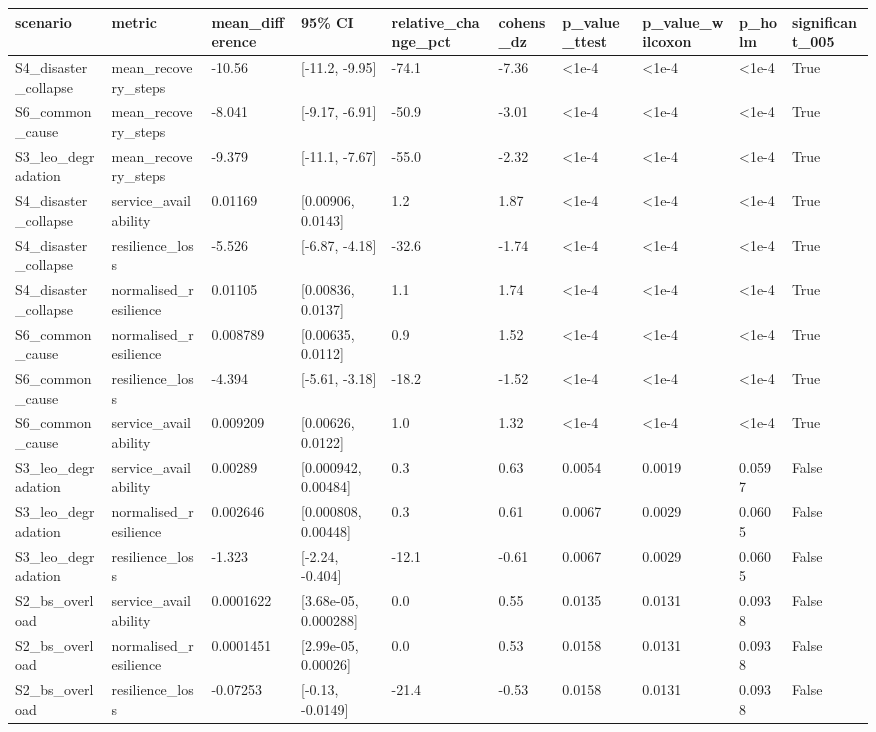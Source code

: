 \begin{tabular}{llllllllll}
\toprule
scenario & metric & mean\_difference & 95\% CI & relative\_change\_pct & cohens\_dz & p\_value\_ttest & p\_value\_wilcoxon & p\_holm & significant\_005 \\
\midrule
S4\_disaster\_collapse & mean\_recovery\_steps & -10.56 & [-11.2, -9.95] & -74.1 & -7.36 & <1e-4 & <1e-4 & <1e-4 & True \\
S6\_common\_cause & mean\_recovery\_steps & -8.041 & [-9.17, -6.91] & -50.9 & -3.01 & <1e-4 & <1e-4 & <1e-4 & True \\
S3\_leo\_degradation & mean\_recovery\_steps & -9.379 & [-11.1, -7.67] & -55.0 & -2.32 & <1e-4 & <1e-4 & <1e-4 & True \\
S4\_disaster\_collapse & service\_availability & 0.01169 & [0.00906, 0.0143] & 1.2 & 1.87 & <1e-4 & <1e-4 & <1e-4 & True \\
S4\_disaster\_collapse & resilience\_loss & -5.526 & [-6.87, -4.18] & -32.6 & -1.74 & <1e-4 & <1e-4 & <1e-4 & True \\
S4\_disaster\_collapse & normalised\_resilience & 0.01105 & [0.00836, 0.0137] & 1.1 & 1.74 & <1e-4 & <1e-4 & <1e-4 & True \\
S6\_common\_cause & normalised\_resilience & 0.008789 & [0.00635, 0.0112] & 0.9 & 1.52 & <1e-4 & <1e-4 & <1e-4 & True \\
S6\_common\_cause & resilience\_loss & -4.394 & [-5.61, -3.18] & -18.2 & -1.52 & <1e-4 & <1e-4 & <1e-4 & True \\
S6\_common\_cause & service\_availability & 0.009209 & [0.00626, 0.0122] & 1.0 & 1.32 & <1e-4 & <1e-4 & <1e-4 & True \\
S3\_leo\_degradation & service\_availability & 0.00289 & [0.000942, 0.00484] & 0.3 & 0.63 & 0.0054 & 0.0019 & 0.0597 & False \\
S3\_leo\_degradation & normalised\_resilience & 0.002646 & [0.000808, 0.00448] & 0.3 & 0.61 & 0.0067 & 0.0029 & 0.0605 & False \\
S3\_leo\_degradation & resilience\_loss & -1.323 & [-2.24, -0.404] & -12.1 & -0.61 & 0.0067 & 0.0029 & 0.0605 & False \\
S2\_bs\_overload & service\_availability & 0.0001622 & [3.68e-05, 0.000288] & 0.0 & 0.55 & 0.0135 & 0.0131 & 0.0938 & False \\
S2\_bs\_overload & normalised\_resilience & 0.0001451 & [2.99e-05, 0.00026] & 0.0 & 0.53 & 0.0158 & 0.0131 & 0.0938 & False \\
S2\_bs\_overload & resilience\_loss & -0.07253 & [-0.13, -0.0149] & -21.4 & -0.53 & 0.0158 & 0.0131 & 0.0938 & False \\

\end{tabular}
